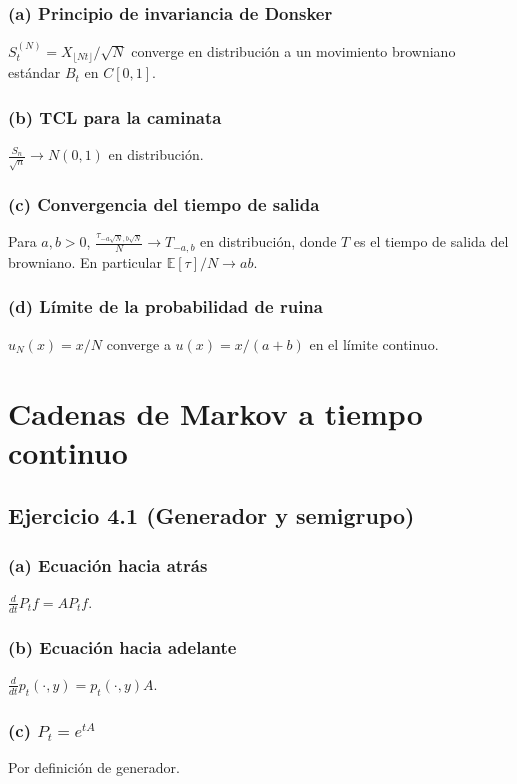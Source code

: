 \documentclass[12pt]{article}
\newcommand{\E}{\mathbb{E}}
\newcommand{\1}{\mathbf{1}}
\begin{document}
\subsubsection*{(a) Principio de invariancia de Donsker}
$S_t^{(N)}=X_{\lfloor Nt\rfloor}/\sqrt{N}$ converge en distribuci\'on a un movimiento browniano estándar $B_t$ en $C[0,1]$.

\subsubsection*{(b) TCL para la caminata}
$\frac{S_n}{\sqrt{n}}\to N(0,1)$ en distribuci\'on.

\subsubsection*{(c) Convergencia del tiempo de salida}
Para $a,b>0$, $\frac{\tau_{-a\sqrt{N},b\sqrt{N}}}{N}\to T_{-a,b}$ en distribuci\'on, donde $T$ es el tiempo de salida del browniano. En particular $\E[\tau]/N\to ab$.

\subsubsection*{(d) L\'imite de la probabilidad de ruina}
$u_N(x)=x/N$ converge a $u(x)=x/(a+b)$ en el l\'imite continuo.

\section{Cadenas de Markov a tiempo continuo}

\subsection{Ejercicio 4.1 (Generador y semigrupo)}

\subsubsection*{(a) Ecuaci\'on hacia atr\'as}
$\frac{d}{dt}P_tf = A P_t f$.

\subsubsection*{(b) Ecuaci\'on hacia adelante}
$\frac{d}{dt}p_t(\cdot,y)=p_t(\cdot,y)A$.

\subsubsection*{(c) $P_t=e^{tA}$}
Por definici\'on de generador.
\end{document}
